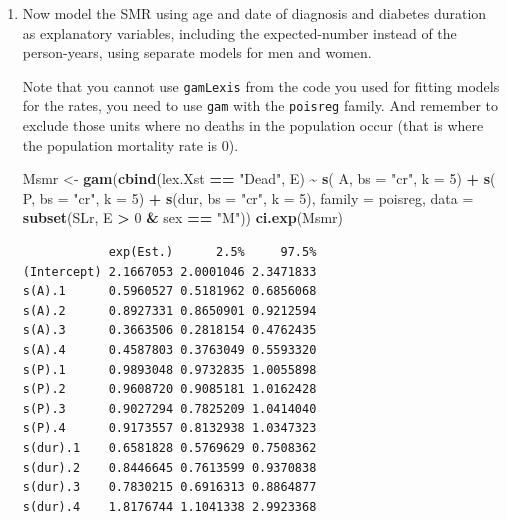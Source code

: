 \documentclass[
]{book}
\newenvironment{Shaded}{\begin{snugshade}}{\end{snugshade}}
\newcommand{\AttributeTok}[1]{\textcolor[rgb]{0.13,0.29,0.53}{#1}}
\newcommand{\DecValTok}[1]{\textcolor[rgb]{0.00,0.00,0.81}{#1}}
\newcommand{\FunctionTok}[1]{\textcolor[rgb]{0.13,0.29,0.53}{\textbf{#1}}}
\newcommand{\NormalTok}[1]{#1}
\newcommand{\OtherTok}[1]{\textcolor[rgb]{0.56,0.35,0.01}{#1}}
\newcommand{\SpecialCharTok}[1]{\textcolor[rgb]{0.81,0.36,0.00}{\textbf{#1}}}
\newcommand{\StringTok}[1]{\textcolor[rgb]{0.31,0.60,0.02}{#1}}
\theoremstyle{definition}
\theoremstyle{definition}
\theoremstyle{definition}
\theoremstyle{definition}
\theoremstyle{remark}
\begin{document}
\begin{enumerate}
\def\labelenumi{\arabic{enumi}.}
\setcounter{enumi}{13}
\item
  Now model the SMR using age and date of diagnosis and diabetes
  duration as explanatory variables, including the expected-number
  instead of the person-years, using separate models for
  men and women.

  Note that you cannot use \texttt{gamLexis} from the code you used for
  fitting models for the rates, you need to use \texttt{gam} with
  the \texttt{poisreg} family. And remember to exclude those units
  where no deaths in the population occur (that is where the
  population mortality rate is 0).

\begin{Shaded}
\begin{Highlighting}[]
\NormalTok{Msmr }\OtherTok{\textless{}{-}} \FunctionTok{gam}\NormalTok{(}\FunctionTok{cbind}\NormalTok{(lex.Xst }\SpecialCharTok{==} \StringTok{"Dead"}\NormalTok{, E)}
            \SpecialCharTok{\textasciitilde{}} \FunctionTok{s}\NormalTok{(  A, }\AttributeTok{bs =} \StringTok{"cr"}\NormalTok{, }\AttributeTok{k =} \DecValTok{5}\NormalTok{) }\SpecialCharTok{+}
              \FunctionTok{s}\NormalTok{(  P, }\AttributeTok{bs =} \StringTok{"cr"}\NormalTok{, }\AttributeTok{k =} \DecValTok{5}\NormalTok{) }\SpecialCharTok{+}
              \FunctionTok{s}\NormalTok{(dur, }\AttributeTok{bs =} \StringTok{"cr"}\NormalTok{, }\AttributeTok{k =} \DecValTok{5}\NormalTok{),}
            \AttributeTok{family =}\NormalTok{ poisreg,}
              \AttributeTok{data =} \FunctionTok{subset}\NormalTok{(SLr, E }\SpecialCharTok{\textgreater{}} \DecValTok{0} \SpecialCharTok{\&}\NormalTok{ sex }\SpecialCharTok{==} \StringTok{"M"}\NormalTok{))}
\FunctionTok{ci.exp}\NormalTok{(Msmr)}
\end{Highlighting}
\end{Shaded}

\begin{verbatim}
            exp(Est.)      2.5%     97.5%
(Intercept) 2.1667053 2.0001046 2.3471833
s(A).1      0.5960527 0.5181962 0.6856068
s(A).2      0.8927331 0.8650901 0.9212594
s(A).3      0.3663506 0.2818154 0.4762435
s(A).4      0.4587803 0.3763049 0.5593320
s(P).1      0.9893048 0.9732835 1.0055898
s(P).2      0.9608720 0.9085181 1.0162428
s(P).3      0.9027294 0.7825209 1.0414040
s(P).4      0.9173557 0.8132938 1.0347323
s(dur).1    0.6581828 0.5769629 0.7508362
s(dur).2    0.8446645 0.7613599 0.9370838
s(dur).3    0.7830215 0.6916313 0.8864877
s(dur).4    1.8176744 1.1041338 2.9923368
\end{verbatim}


\end{enumerate}
\end{document}
